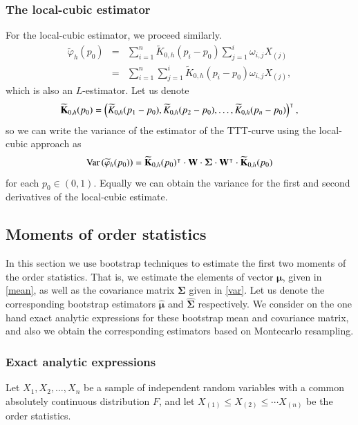 \documentclass[preprint,12pt]{elsarticle}
\begin{document}
\subsubsection{The local-cubic estimator}
\noindent For the local-cubic estimator, we proceed similarly.
\begin{eqnarray*}
\widetilde{\varphi}_h(p_0)&=&\sum_{i=1}^n \widetilde{K}_{0,h}(p_i-p_0)\sum_{j=1}^i\omega_{i,j}X_{(j)} \\
&=& \sum_{i=1}^n \sum_{j=1}^i \widetilde{K}_{0,h}(p_i-p_0)\omega_{i,j}X_{(j)},
\end{eqnarray*}
which is also an $L$-estimator. Let us denote 
$$\widetilde{\bf K}_{0,h}(p_0)=\left(\widetilde{ K}_{0,h}(p_1-p_0), \widetilde{ K}_{0,h}(p_2-p_0),\ldots,\widetilde{ K}_{0,h}(p_n-p_0)\right)^{\intercal},$$
 so we can write the variance of the estimator of the TTT-curve using the local-cubic approach as
\begin{equation}\label{V.phi0.cubic}
{\rm Var} \left(\widetilde{\varphi}_h(p_0)\right)= \widetilde{\bf K}_{0,h}(p_0)^{\intercal}\cdot {\bf W} \cdot {\boldsymbol{\Sigma}}\cdot  {\bf W}^{\intercal}\cdot \widetilde{\bf K}_{0,h}(p_0)
\end{equation}
for each $p_0 \in (0,1)$. Equally we can obtain the variance for the first and second derivatives of the local-cubic estimate.

\bigskip
\subsection{Moments of order statistics}
\noindent In this section we use bootstrap techniques to estimate the first two moments of the order statistics. That is, we estimate the elements of vector $\boldsymbol{\mu}$, given in \eqref{mean}, as well as the covariance matrix $\boldsymbol{\Sigma}$ given in \eqref{var}. Let us denote the corresponding bootstrap estimators $\widehat{\boldsymbol{\mu}}$ and $\widehat{\boldsymbol{\Sigma}}$ respectively.  We consider on the one hand exact analytic expressions for these bootstrap mean and covariance matrix, and also we obtain the corresponding estimators based on Montecarlo resampling. 

\subsubsection{Exact analytic expressions}
\noindent Let $X_1,X_2,\ldots, X_n$ be a sample of independent random variables with a common absolutely continuous distribution $F$, and let  $X_{(1)} \leq X_{(2)}\leq \cdots X_{(n)}$ be the order statistics. 
\end{document}
